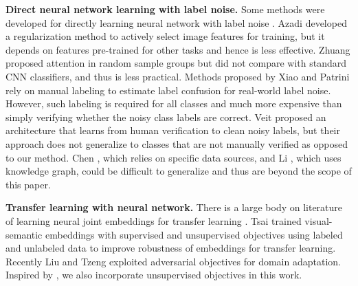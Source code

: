 \documentclass[10pt,twocolumn,letterpaper]{article}
\begin{document}
\noindent
\textbf{Direct neural network learning with label noise.} Some methods were developed for directly learning neural network with label noise \cite{azadi2016auxiliary,chen2015webly,li2017learning,patrini2017making,rolnick2017deep,sukhbaatar2014training,veit2017learning,xiao2015learning,zhuang2017attend}. Azadi \etal \cite{azadi2016auxiliary} developed a regularization method to actively select image features for training, but it depends on features pre-trained for other tasks and hence is less effective. Zhuang \etal \cite{zhuang2017attend} proposed attention in random sample groups but did not compare with standard CNN classifiers, and thus is less practical. Methods proposed by Xiao \etal \cite{xiao2015learning} and Patrini \etal \cite{patrini2017making} rely on manual labeling to estimate label confusion for real-world label noise. However, such labeling is required for all classes and much more expensive than simply verifying whether the noisy class labels are correct. Veit \etal \cite{veit2017learning} proposed an architecture that learns from human verification to clean noisy labels, but their approach does not generalize to classes that are not manually verified as opposed to our method. Chen \etal \cite{chen2015webly}, which relies on specific data sources, and Li \etal \cite{li2017learning}, which uses knowledge graph, could be difficult to generalize and thus are beyond the scope of this paper.


\noindent
\textbf{Transfer learning with neural network.} There is a large body on literature of learning neural joint embeddings for transfer learning \cite{frome2013devise,salvador2017learning,socher2013zero,tsai2017learning,vinyals2016matching}. Tsai \etal \cite{tsai2017learning} trained visual-semantic embeddings with supervised and unsupervised objectives using labeled and unlabeled data to improve robustness of embeddings for transfer learning. Recently Liu \etal \cite{liu2016coupled} and Tzeng \etal \cite{tzeng2017adversarial} exploited adversarial objectives for domain adaptation. Inspired by \cite{tsai2017learning}, we also incorporate unsupervised objectives in this work.
\end{document}
